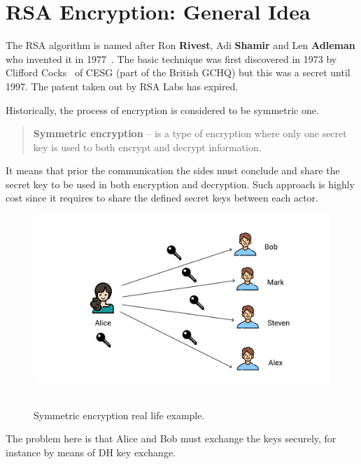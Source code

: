 \documentclass[12pt,letterpaper,oneside,reqno]{amsart}
\begin{document}
    \section{RSA Encryption: General Idea}\label{sec:rsa-encryption-algorithm}
    The RSA algorithm is named after Ron \textbf{Rivest}, Adi \textbf{Shamir} and Len \textbf{Adleman}
    who invented it in 1977~\cite{rivest1978method}.
    The basic technique was first discovered in 1973 by Clifford Cocks~\cite{cocks1973note} of CESG (part of the British GCHQ)
    but this was a secret until 1997.
    The patent taken out by RSA Labs has expired.

    Historically, the process of encryption is considered to be symmetric one.
    \begin{quote}
        \textbf{Symmetric encryption} -- is a type of encryption where only one secret key is
        used to both encrypt and decrypt information.
    \end{quote}
    It means that prior the communication the sides must conclude and share the secret key to be used in
    both encryption and decryption.
    Such approach is highly cost since it requires to share the defined secret keys between each actor.

    \begin{figure}[H]
        \centering
        \includegraphics[width=1\textwidth]{Symmetric_encryption}
        ~\caption{Symmetric encryption real life example.}\label{fig:figure}
    \end{figure}

    The problem here is that Alice and Bob must exchange the keys securely, for instance by means of DH key exchange.
\end{document}
